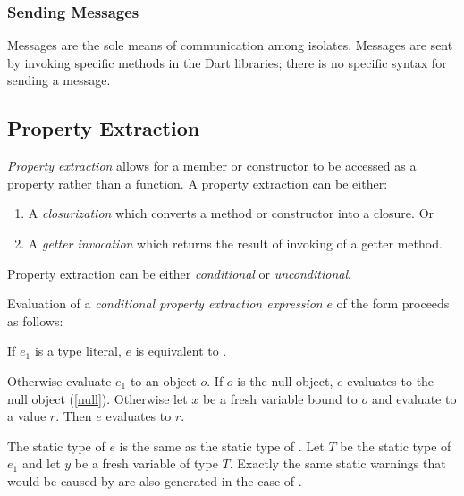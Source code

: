\documentclass{article}
\begin{document}
\subsubsection{Sending Messages}

\LMHash{}
Messages are the sole means of communication among isolates.
Messages are sent by invoking specific methods in the Dart libraries; there is no specific syntax for sending a message.



\subsection{Property Extraction}

\LMHash{}
{\em Property extraction} allows for a member or constructor to be accessed as a property rather than a function.
A property extraction can be either:
\begin{enumerate}
\item A {\em closurization} which converts a method or constructor into a closure.
Or
\item A {\em getter invocation} which returns the result of invoking of a getter method.
\end{enumerate}


Property extraction can be either {\em conditional} or {\em unconditional}.

\LMHash{}
Evaluation of a {\em conditional property extraction expression} $e$
of the form  proceeds as follows:

\LMHash{}
If $e_1$ is a type literal, $e$ is equivalent to .

\LMHash{}
Otherwise evaluate $e_1$ to an object $o$.
If $o$ is the null object, $e$ evaluates to the null object (\ref{null}).
Otherwise let $x$ be a fresh variable bound to $o$
and evaluate  to a value $r$.
Then $e$ evaluates to $r$.

The static type of $e$ is the same as the static type of .
Let $T$ be the static type of $e_1$ and let $y$ be a fresh variable of type $T$.
Exactly the same static warnings that would be caused by  are also generated in the case of .
\end{document}

